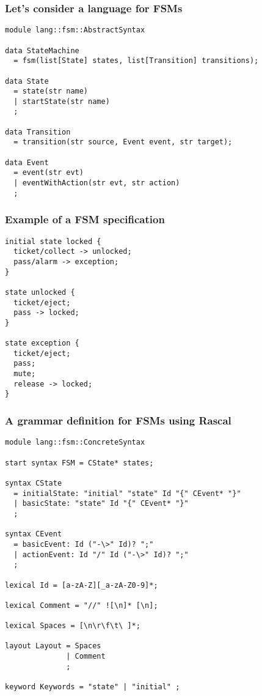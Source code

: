 \documentclass{beamer}
\begin{document}
\begin{frame}[fragile]
\frametitle{Let's consider a language for FSMs} 

\begin{lstlisting}[language=Rascal]
module lang::fsm::AbstractSyntax

data StateMachine 
  = fsm(list[State] states, list[Transition] transitions);

data State 
  = state(str name)
  | startState(str name)
  ;
           
data Transition 
  = transition(str source, Event event, str target);
  
data Event 
  = event(str evt)
  | eventWithAction(str evt, str action)
  ;
\end{lstlisting}
\end{frame}

\begin{frame}[fragile]
 \frametitle{Example of a FSM specification}

 \begin{lstlisting}[language=FSM]
initial state locked {
  ticket/collect -> unlocked;
  pass/alarm -> exception;
}

state unlocked {
  ticket/eject;
  pass -> locked;
}

state exception {
  ticket/eject;
  pass;
  mute;
  release -> locked;
}
 \end{lstlisting}
\end{frame}

\begin{frame}[fragile]
\frametitle{A grammar definition for FSMs using Rascal}

\begin{lstlisting}[language=Rascal]
module lang::fsm::ConcreteSyntax

start syntax FSM = CState* states;

syntax CState 
  = initialState: "initial" "state" Id "{" CEvent* "}"
  | basicState: "state" Id "{" CEvent* "}"
  ;

syntax CEvent 
  = basicEvent: Id ("-\>" Id)? ";"
  | actionEvent: Id "/" Id ("-\>" Id)? ";"
  ; 

lexical Id = [a-zA-Z][_a-zA-Z0-9]*; 

lexical Comment = "//" ![\n]* [\n];

lexical Spaces = [\n\r\f\t\ ]*;

layout Layout = Spaces 
              | Comment 
              ; 

keyword Keywords = "state" | "initial" ;
\end{lstlisting} 

\end{frame}
\end{document}

